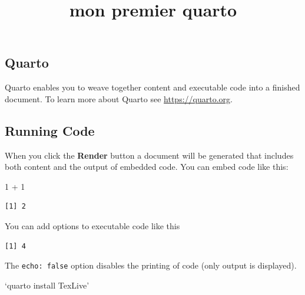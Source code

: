 \documentclass[
  letterpaper,
  DIV=11,
  numbers=noendperiod]{scrartcl}
\title{mon premier quarto}
\author{}
\date{}
\newenvironment{Shaded}{\begin{snugshade}}{\end{snugshade}}
\newcommand{\DecValTok}[1]{\textcolor[rgb]{0.68,0.00,0.00}{#1}}
\newcommand{\SpecialCharTok}[1]{\textcolor[rgb]{0.37,0.37,0.37}{#1}}
\begin{document}
\maketitle

\subsection{Quarto}\label{quarto}

Quarto enables you to weave together content and executable code into a
finished document. To learn more about Quarto see
\url{https://quarto.org}.

\subsection{Running Code}\label{running-code}

When you click the \textbf{Render} button a document will be generated
that includes both content and the output of embedded code. You can
embed code like this:

\begin{Shaded}
\begin{Highlighting}[]
\DecValTok{1} \SpecialCharTok{+} \DecValTok{1}
\end{Highlighting}
\end{Shaded}

\begin{verbatim}
[1] 2
\end{verbatim}

You can add options to executable code like this

\begin{verbatim}
[1] 4
\end{verbatim}

The \texttt{echo:\ false} option disables the printing of code (only
output is displayed).

`quarto install TexLive'
\end{document}
